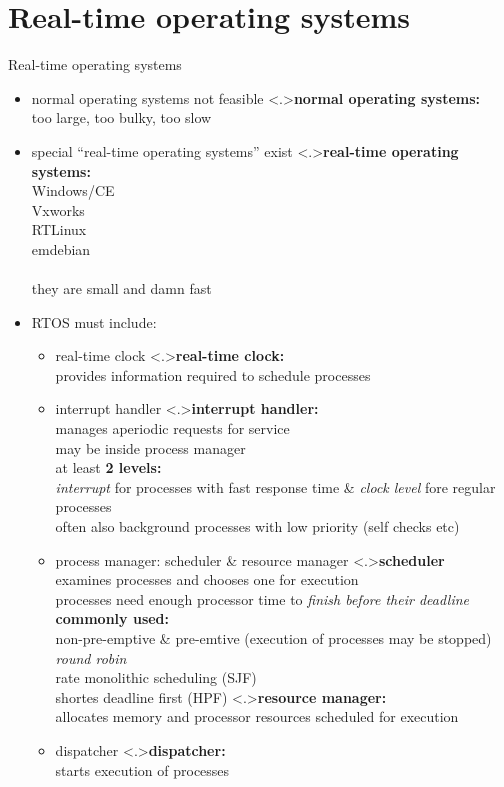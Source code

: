 \documentclass[ngerman={babel}, utf8, bigger, xcolor={table,dvipsnames}, ompress, hyperref={bookmarks,colorlinks}]{beamer}
\begin{document}
\section{Real-time operating systems}
\begin{frame}{Real-time operating systems}
	\begin{itemize}
		\item normal operating systems not feasible
		\note<.>{\textbf{normal operating systems:}\\ too large, too bulky, too slow}
		\item special ``real-time operating systems'' exist
		\note<.>{\textbf{real-time operating systems:}\\Windows/CE \\ Vxworks \\ RTLinux \\ emdebian\\ \ \\ they are small and damn fast}
		\item RTOS must include:
		\begin{itemize}
			\item real-time clock
			\note<.>{\textbf{real-time clock:}\\ provides information required to schedule processes}
			\item interrupt handler
			\note<.>{\textbf{interrupt handler:}\\ manages aperiodic requests for service \\ may be inside process manager \\ at least \textbf{2 levels:} \\ \emph{interrupt} for processes with fast response time \& \emph {clock level} fore regular processes \\ often also background processes with low priority {\tiny (self checks etc)}}
			\item process manager: scheduler \& resource manager
			\note<.>{\textbf{scheduler}\\ examines processes and chooses one for execution \\ processes need enough processor time to \emph{finish before their deadline} \\ \textbf{commonly used:} \\ non-pre-emptive \& pre-emtive (execution of processes may be stopped) \\ \emph{round robin} \\ rate monolithic scheduling (SJF) \\ shortes deadline first (HPF) }
			\note<.>{\textbf{resource manager:}\\ allocates memory and processor resources scheduled for execution}
			\item dispatcher
			\note<.>{\textbf{dispatcher:}\\ starts execution of processes}
		\end{itemize}
	\end{itemize}
\end{frame}
\end{document}
